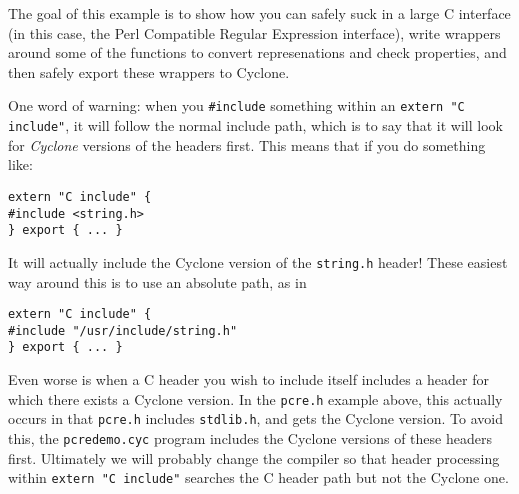 The goal of this example is to show how you can safely suck in
a large C interface (in this case, the Perl Compatible Regular Expression
interface), write wrappers around some of the functions to convert
represenations and check properties, and then safely export these
wrappers to Cyclone.  

One word of warning: when you \texttt{\#include} something within an
\texttt{extern "C include"}, it will follow the normal include path,
which is to say that it will look for \emph{Cyclone} versions of the
headers first.  This means that if you do something like:
\begin{verbatim}
extern "C include" {
#include <string.h>
} export { ... }
\end{verbatim}
It will actually include the Cyclone version of the \texttt{string.h}
header!  These easiest way around this is to use an absolute path, as
in
\begin{verbatim}
extern "C include" {
#include "/usr/include/string.h"
} export { ... }
\end{verbatim}
Even worse is when a C header you wish to include itself includes a
header for which there exists a Cyclone version.  In the
\texttt{pcre.h} example above, this actually occurs in that
\texttt{pcre.h} includes \texttt{stdlib.h}, and gets the Cyclone
version.  To avoid this, the \texttt{pcredemo.cyc} program includes
the Cyclone versions of these headers first.  Ultimately we will
probably change the compiler so that header processing within
\texttt{extern "C include"} searches the C header path but not the
Cyclone one.
